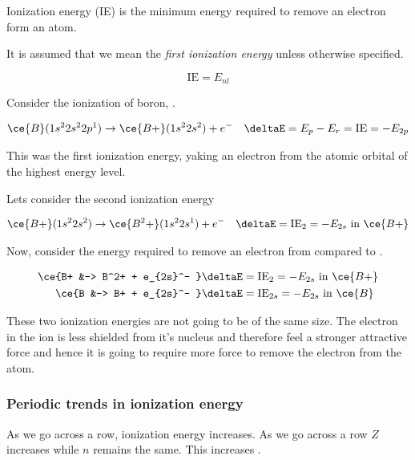 \documentclass[../mit-general-chemistry.tex]{subfiles}
\begin{document}
Ionization energy (IE) is the minimum energy required to remove an
electron form an atom.

It is assumed that we mean the {\em first ionization energy} unless
otherwise specified.

\begin{equation}
  \text{IE} = E_{nl}
\end{equation}


Consider the ionization of boron, .

\begin{align*}
  \ce{B}(1s^22s^22p^1) &\rightarrow \ce{B+}(1s^22s^2) + e^-
  & \deltaE = E_p - E_r = \text{IE} = -E_{2p}
\end{align*}

This was the first ionization energy, yaking an electron from the
atomic orbital of the highest energy level.

Lets consider the second ionization energy

\begin{align*}
  \ce{B+}(1s^22s^2) &\rightarrow \ce{B^2+}(1s^22s^1) + e^-
  & \deltaE = \text{IE}_2 = -E_{2s} ~\text{in}~\ce{B+}
\end{align*}



Now, consider the energy required to remove an electron from 
compared to .

\begin{align*}
  \ce{B+ &-> B^2+ + e_{2s}^- } & \deltaE = \text{IE}_2 = -E_{2s} ~\text{in}~\ce{B+}\\
  \ce{B &-> B+ + e_{2s}^- } & \deltaE = \text{IE}_{2s} = -E_{2s} ~\text{in}~\ce{B}\\
\end{align*}

These two ionization energies are not going to be of the same
size. The electron in the ion is less shielded from it's nucleus and
therefore feel a stronger attractive force and hence it is going to
require more force to remove the electron from the atom.



\subsubsection{Periodic trends in ionization energy}

As we go across a row, ionization energy increases. As we go across
a row $Z$ increases while $n$ remains the same. This increases \Zeff.
\end{document}
